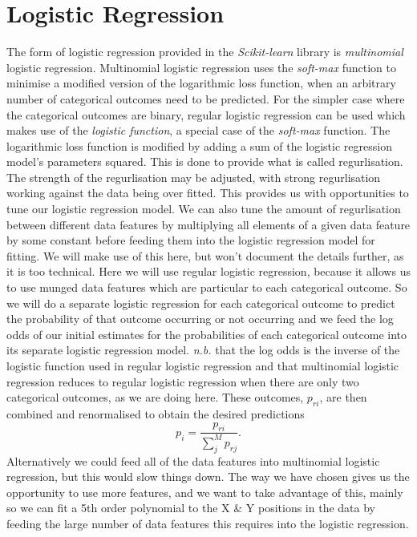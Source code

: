 \documentclass[12pt,notitlepage]{article}
\begin{document}
\section{Logistic Regression}
The form of logistic regression provided in the \emph{Scikit-learn} library is \emph{multinomial} logistic regression. Multinomial logistic regression uses the \emph{soft-max} function to minimise a modified version of the logarithmic loss function, when an arbitrary number of categorical outcomes need to be predicted. For the simpler case where the categorical outcomes are binary, regular logistic regression can be used which makes use of the \emph{logistic function}, a special case of the \emph{soft-max} function. The logarithmic loss function is modified by adding a sum of the logistic regression model's parameters squared. This is done to provide what is called regurlisation. The strength of the regurlisation may be adjusted, with strong regurlisation working against the data being over fitted. This provides us with opportunities to tune our logistic regression model. We can also tune the amount of regurlisation between different data features by multiplying all elements of a given data feature by some constant before feeding them into the logistic regression model for fitting. We will make use of this here, but won't document the details further, as it is too technical.
	Here we will use regular logistic regression, because it allows us to use munged data features which are particular to each categorical outcome. So we will do a separate logistic regression for each categorical outcome to predict the probability of that outcome occurring or not occurring and we feed the log odds of our initial estimates for the probabilities of each categorical outcome into its separate logistic regression model.  \emph{n.b.} that the log odds is the inverse of the logistic function used in regular logistic regression and that multinomial logistic regression reduces to regular logistic regression when there are only two categorical outcomes, as we are doing here. These outcomes, $p_{ri}$, are then combined and renormalised to obtain the desired predictions
\begin{equation}
p_i = \frac{p_{ri}}{\sum_j^M p_{rj}}.
\end{equation}
Alternatively we could feed all of the data features into multinomial logistic regression, but this would slow things down. The way we have chosen gives us the opportunity to use more features, and we want to take advantage of this, mainly so we can fit a 5th order polynomial to the X \& Y positions in the data by feeding the large number of data features this requires into the logistic regression. 
\end{document}

